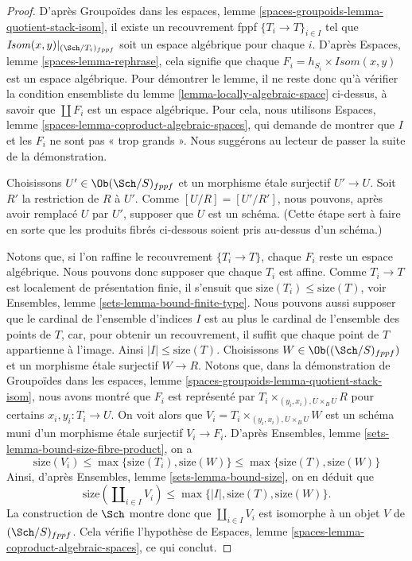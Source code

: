 \begin{proof}
D'après
Groupoïdes dans les espaces,
lemme \ref{spaces-groupoids-lemma-quotient-stack-isom},
il existe un recouvrement fppf $\{T_i \to T\}_{i \in I}$
tel que $\mathit{Isom}(x, y)|_{(\Sch/T_i)_{fppf}}$
soit un espace algébrique pour chaque $i$. D'après
Espaces, lemme \ref{spaces-lemma-rephrase},
cela signifie que chaque $F_i = h_{S_i} \times \mathit{Isom}(x, y)$
est un espace algébrique.
Pour démontrer le lemme, il ne reste donc qu'à vérifier la condition ensembliste
du lemme \ref{lemma-locally-algebraic-space} ci-dessus, à savoir que
$\coprod F_i$ est un espace algébrique. Pour cela, nous utilisons
Espaces, lemme \ref{spaces-lemma-coproduct-algebraic-spaces},
qui demande de montrer que $I$ et les $F_i$ ne sont pas « trop grands ».
Nous suggérons au lecteur de passer la suite de la démonstration.

\medskip\noindent
Choisissons $U' \in \Ob(\Sch/S)_{fppf}$ et un morphisme
étale surjectif $U' \to U$. Soit $R'$ la restriction de $R$ à $U'$.
Comme $[U/R] = [U'/R']$, nous pouvons, après avoir remplacé $U$ par $U'$,
supposer que $U$ est un schéma. (Cette étape sert à faire en sorte que les
produits fibrés ci-dessous soient pris au-dessus d'un schéma.)

\medskip\noindent
Notons que, si l'on raffine le recouvrement $\{T_i \to T\}$, chaque
$F_i$ reste un espace algébrique.
Nous pouvons donc supposer que chaque $T_i$ est affine. Comme
$T_i \to T$ est localement de présentation finie, il s'ensuit que
$\text{size}(T_i) \leq \text{size}(T)$, voir
Ensembles, lemme \ref{sets-lemma-bound-finite-type}.
Nous pouvons aussi supposer que le cardinal de l'ensemble d'indices $I$ est au plus le
cardinal de l'ensemble des points de $T$, car, pour obtenir un
recouvrement, il suffit que chaque point de $T$ appartienne à l'image.
Ainsi $|I| \leq \text{size}(T)$.
Choisissons $W \in \Ob((\Sch/S)_{fppf})$
et un morphisme étale surjectif $W \to R$. Notons que, dans la démonstration de
Groupoïdes dans les espaces,
lemme \ref{spaces-groupoids-lemma-quotient-stack-isom},
nous avons montré que $F_i$ est représenté par
$T_i \times_{(y_i, x_i), U \times_B U} R$ pour certains
$x_i, y_i : T_i \to U$. On voit alors que
$V_i = T_i \times_{(y_i, x_i), U \times_B U} W$ est un
schéma muni d'un morphisme étale surjectif $V_i \to F_i$.
D'après
Ensembles, lemme \ref{sets-lemma-bound-size-fibre-product},
on a
$$
\text{size}(V_i) \leq \max\{\text{size}(T_i), \text{size}(W)\}
\leq \max\{\text{size}(T), \text{size}(W)\}
$$
Ainsi, d'après
Ensembles, lemme \ref{sets-lemma-bound-size},
on en déduit que
$$
\text{size}(\coprod\nolimits_{i \in I} V_i)
\leq \max\{|I|, \text{size}(T), \text{size}(W)\}.
$$
La construction de $\Sch$ montre donc
que $\coprod_{i \in I} V_i$ est isomorphe à un objet
$V$ de $(\Sch/S)_{fppf}$. Cela vérifie
l'hypothèse de
Espaces, lemme \ref{spaces-lemma-coproduct-algebraic-spaces},
ce qui conclut.
\end{proof}


